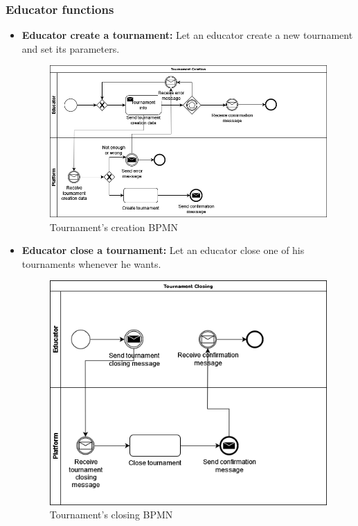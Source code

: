\documentclass{article}
\begin{document}
{    \subsubsection{Educator functions}
        \begin{itemize}
            \item \textbf{Educator create a tournament:} Let an educator create a new tournament and set its parameters.
            \begin{figure}[H]
                \centering
                \includegraphics[scale=0.4]{images/BPMN/TournamentCreation.png}
                \caption{Tournament's creation BPMN}
                \label{fig:TournamentCreationBPMN}
            \end{figure}

            \item \textbf{Educator close a tournament:} Let an educator close one of his tournaments whenever he wants.
            \begin{figure}[H]
                \centering
                \includegraphics[scale=0.4]{images/BPMN/TournamentClosing.png}
                \caption{Tournament's closing BPMN}
                \label{fig:TournamentClosingBPMN}
            \end{figure}


\end{itemize}}
\end{document}
